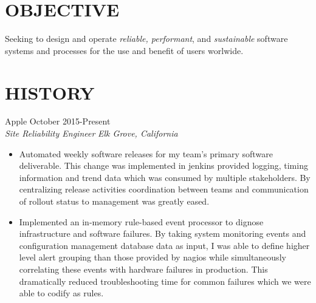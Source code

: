 \documentclass[line,margin]{res}
\begin{document}
\normalsize
\begin{flushright}
\address{ (916) 307-8633}
\end{flushright}
 
\begin{resume}
 
\section{OBJECTIVE}  Seeking to design and operate {\sl reliable, performant}, and  {\sl sustainable} software systems and processes for the use and benefit of users worlwide.

\section{HISTORY}

\large Apple \hfill  \large October 2015-Present \\
\normalsize
{ \sl Site Reliability Engineer} \hfill {\sl  Elk Grove, California }

\begin{itemize} \itemsep -2pt %
  \item Automated weekly software releases for my team's primary software deliverable.  This change was implemented in jenkins provided logging, timing information and trend data which was consumed by multiple stakeholders.  By centralizing release activities coordination between teams and communication of rollout status to management was greatly eased. \\
  \item Implemented an in-memory rule-based event processor to dignose infrastructure and software failures.  By taking system monitoring events and configuration management database data as input, I was able to define higher level alert grouping than those provided by nagios while simultaneously correlating these events with hardware failures in production.  This dramatically reduced troubleshooting time for common failures which we were able to codify as rules. \\



\end{itemize}
\end{resume}
\end{document}
